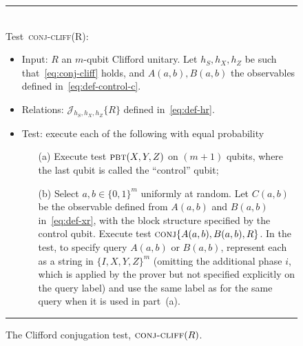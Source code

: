 \documentclass{toc}
\newcommand{\pbt}{\textsc{pbt}}
\newcommand{\conj}{\textsc{conj}}
\newcommand{\conjc}{\textsc{conj-cliff}}
\newcommand{\conjr}{\mathcal{J}\!}
\begin{document}
\begin{figure}[H]
\rule[1ex]{\textwidth}{0.5pt}\\
Test~\conjc(R): 
\begin{itemize}
    \item Input: $R$ an $m$-qubit Clifford unitary. 	Let $h_S,h_X,h_Z$ be such that~\eqref{eq:conj-cliff} holds, and $A(a,b),B(a,b)$ the observables defined in~\eqref{eq:def-control-c}. 
    \item Relations: $\conjr_{h_S,h_X,h_Z}\{R\}$ defined in~\eqref{eq:def-hr}. 
    \item Test: execute each of the following with equal probability
\begin{enumerate}
\item[(a)] Execute test $\pbt(X,Y,Z)$ on $(m+1)$ qubits, where the last qubit is called the ``control'' qubit;
\item[(b)] Select $a,b\in\{0,1\}^m$ uniformly at random. Let $C(a,b)$ be the observable defined from $A(a,b)$ and $B(a,b)$ in~\eqref{eq:def-xr}, with the block structure specified by the control qubit. Execute test $\conj\{A(a,b),B(a,b),R\}$. In the test, to specify query $A(a,b)$ or $B(a,b)$, represent each as a string in $\{I,X,Y,Z\}^m$ (omitting the additional phase $i$, which is applied by the prover but not specified explicitly on the query label) and use the same label as for the same query when it is used in part~(a).
\end{enumerate}
\end{itemize}
\rule[2ex]{\textwidth}{0.5pt}\vspace{-0.5cm}
\caption{The Clifford conjugation test, $\conjc(R)$.}
\label{fig:conjugation-test-2}
\end{figure}
\end{document}
